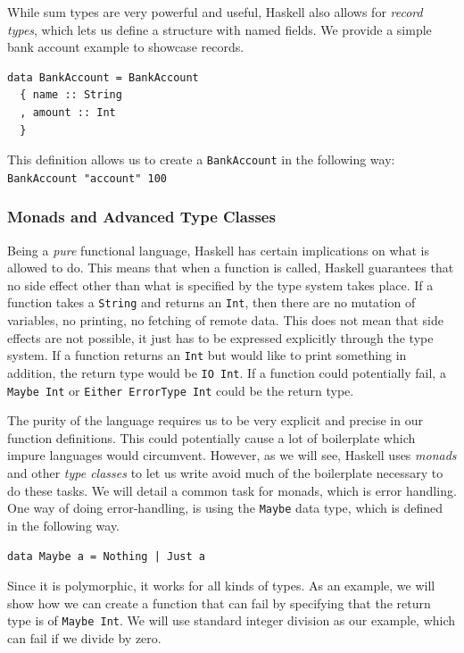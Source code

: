 \documentclass[a4paper,english]{ifimaster}
\begin{document}
While sum types are very powerful and useful, Haskell also allows for \textit{record types}, which lets us define a structure with named fields. We provide a simple bank account example to showcase records.

\begin{verbatim}
data BankAccount = BankAccount
  { name :: String
  , amount :: Int
  }
\end{verbatim}

This definition allows us to create a \texttt{BankAccount} in the following way: \texttt{BankAccount "account" 100}

\subsubsection{Monads and Advanced Type Classes}%
\label{ssub:monads_and_advanced_type_classes}

Being a \textit{pure} functional language, Haskell has certain implications on what is allowed to do. This means that when a function is called, Haskell guarantees that no side effect other than what is specified by the type system takes place. If a function takes a \texttt{String} and returns an \texttt{Int}, then there are no mutation of variables, no printing, no fetching of remote data. This does not mean that side effects are not possible, it just has to be expressed explicitly through the type system. If a function returns an \texttt{Int} but would like to print something in addition, the return type would be \texttt{IO Int}. If a function could potentially fail, a \texttt{Maybe Int} or \texttt{Either ErrorType Int} could be the return type.

The purity of the language requires us to be very explicit and precise in our function definitions. This could potentially cause a lot of boilerplate which impure languages would circumvent. However, as we will see, Haskell uses \textit{monads} and other \textit{type classes} to let us write avoid much of the boilerplate necessary to do these tasks. We will detail a common task for monads, which is error handling. One way of doing error-handling, is using the \texttt{Maybe} data type, which is defined in the following way.

\begin{verbatim}
data Maybe a = Nothing | Just a
\end{verbatim}

Since it is polymorphic, it works for all kinds of types. As an example, we will show how we can create a function that can fail by specifying that the return type is of \texttt{Maybe Int}. We will use standard integer division as our example, which can fail if we divide by zero.
\end{document}
